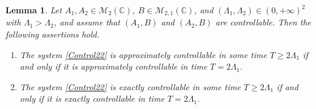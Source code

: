 \documentclass[10pt]{amsart}
\theoremstyle{plain}
\newtheorem{lemm}[theo]{Lemma}
\theoremstyle{definition}
\begin{document}
\begin{lemm}
\label{LemmTime2}
Let $A_1, A_2 \in \mathcal M_2(\mathbb C)$, $B \in \mathcal M_{2, 1}(\mathbb C)$, and $(\Lambda_1, \Lambda_2) \in (0, +\infty)^2$ with $\Lambda_1 > \Lambda_2$, and assume that $(A_1, B)$ and $(A_2, B)$ are controllable. Then the following assertions hold.
\begin{enumerate}
\item The system \eqref{Control22} is approximately controllable in some time $T \geq 2 \Lambda_1$ if and only if it is approximately controllable in time $T = 2 \Lambda_1$.
\item The system \eqref{Control22} is exactly controllable in some time $T \geq 2 \Lambda_1$ if and only if it is exactly controllable in time $T = 2 \Lambda_1$.
\end{enumerate}
\end{lemm}
\end{document}
